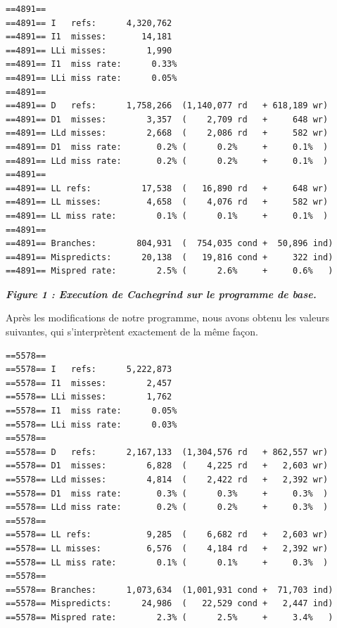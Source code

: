 \documentclass{report}
\begin{document}
\begin{scriptsize}
\begin{lstlisting}
==4891== 
==4891== I   refs:      4,320,762
==4891== I1  misses:       14,181
==4891== LLi misses:        1,990
==4891== I1  miss rate:      0.33%
==4891== LLi miss rate:      0.05%
==4891== 
==4891== D   refs:      1,758,266  (1,140,077 rd   + 618,189 wr)
==4891== D1  misses:        3,357  (    2,709 rd   +     648 wr)
==4891== LLd misses:        2,668  (    2,086 rd   +     582 wr)
==4891== D1  miss rate:       0.2% (      0.2%     +     0.1%  )
==4891== LLd miss rate:       0.2% (      0.2%     +     0.1%  )
==4891== 
==4891== LL refs:          17,538  (   16,890 rd   +     648 wr)
==4891== LL misses:         4,658  (    4,076 rd   +     582 wr)
==4891== LL miss rate:        0.1% (      0.1%     +     0.1%  )
==4891== 
==4891== Branches:        804,931  (  754,035 cond +  50,896 ind)
==4891== Mispredicts:      20,138  (   19,816 cond +     322 ind)
==4891== Mispred rate:        2.5% (      2.6%     +     0.6%   )
\end{lstlisting}
\begin{center}
\textbf{\textit{Figure 1 : Execution de Cachegrind sur le programme de base.}}
\end{center}
\end{scriptsize}

Après les modifications de notre programme, nous avons obtenu les valeurs suivantes, qui s’interprètent exactement de la même façon.
\begin{scriptsize}
\begin{lstlisting}
==5578== 
==5578== I   refs:      5,222,873
==5578== I1  misses:        2,457
==5578== LLi misses:        1,762
==5578== I1  miss rate:      0.05%
==5578== LLi miss rate:      0.03%
==5578== 
==5578== D   refs:      2,167,133  (1,304,576 rd   + 862,557 wr)
==5578== D1  misses:        6,828  (    4,225 rd   +   2,603 wr)
==5578== LLd misses:        4,814  (    2,422 rd   +   2,392 wr)
==5578== D1  miss rate:       0.3% (      0.3%     +     0.3%  )
==5578== LLd miss rate:       0.2% (      0.2%     +     0.3%  )
==5578== 
==5578== LL refs:           9,285  (    6,682 rd   +   2,603 wr)
==5578== LL misses:         6,576  (    4,184 rd   +   2,392 wr)
==5578== LL miss rate:        0.1% (      0.1%     +     0.3%  )
==5578== 
==5578== Branches:      1,073,634  (1,001,931 cond +  71,703 ind)
==5578== Mispredicts:      24,986  (   22,529 cond +   2,447 ind)
==5578== Mispred rate:        2.3% (      2.5%     +     3.4%   )
\end{lstlisting}
\end{scriptsize}
\end{document}

